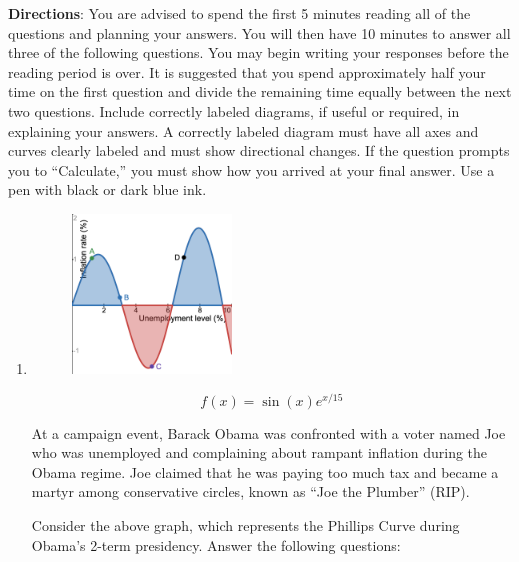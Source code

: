 \noindent\textbf{Directions}: You are advised to spend the first 5 minutes
reading all of the questions and planning your answers. You will then
have 10 minutes to answer all three of the following questions. You may
begin writing your responses before the reading period is over. It is
suggested that you spend approximately half your time on the first
question and divide the remaining time equally between the next two
questions. Include correctly labeled diagrams, if useful or required, in
explaining your answers. A correctly labeled diagram must have all axes
and curves clearly labeled and must show directional changes. If the
question prompts you to “Calculate,” you must show how you arrived at
your final answer. Use a pen with black or dark blue ink. \\

\clearpage
\begin{enumerate}[itemsep=0.5cm]
      \item
            \begin{figure}[h]
                  \centering
                  \includegraphics[width=0.4\textwidth]{assets/phillips.png}
            \end{figure}

            \[
                  f\left(x\right)=\sin\left(x\right)e^{x/15}
            \]

            At a campaign event, Barack Obama was confronted with a voter
            named Joe who was unemployed and complaining about rampant
            inflation during the Obama regime. Joe claimed that he was
            paying too much tax and became a martyr among conservative
            circles, known as ``Joe the Plumber'' (RIP). \\
            \medskip

            Consider the above graph, which represents the Phillips Curve
            during Obama's 2-term presidency. Answer the following questions:\@

            \bigskip


\end{enumerate}
